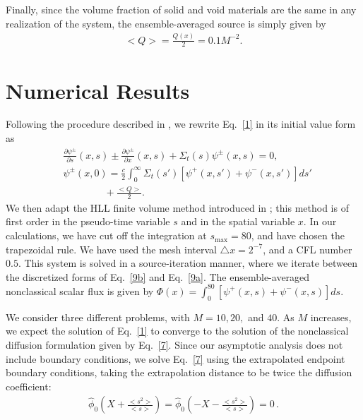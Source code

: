 \documentclass{anstrans}
\newcommand{\bl}{\big<}
\newcommand{\bg}{\big>}
\begin{document}
Finally, since the volume fraction of solid and void materials are the same in any realization of the system, the ensemble-averaged source is simply given by
\begin{align}
\bl Q\bg = \frac{Q(x)}{2} = 0.1M^{-2}.\nonumber
\end{align}


\section{Numerical Results}
Following the procedure described in \cite{vas15}, we rewrite Eq.\ \eqref{1} in its initial value form as
\begin{subequations}\label{9}
\begin{align}
&\frac{\partial\psi^{\pm}}{\partial s}(x,s) \pm \frac{\partial \psi^{\pm}}{\partial x}(x,s) + \Sigma_t(s)\psi^{\pm}(x,s)  = 0, \label{9a}\\
& \psi^{\pm}(x,0)= \frac{c}{2} \int_0^\infty \Sigma_t(s')[\psi^{+}(x,s')+\psi^{-}(x,s')]ds' \label{9b}\\
& \hspace{50pt}+ \frac{\bl Q\bg}{2}. \nonumber
\end{align}
\end{subequations}
We then adapt the HLL finite volume method introduced in \cite{kry13}; this method is of first order in the pseudo-time variable $s$ and in the spatial variable $x$. In our calculations, we have cut off the integration at $s_{\text{max}}=80$, and have chosen the trapezoidal rule. We have used the mesh interval $\triangle x=2^{-7}$, and a CFL number $0.5$. 
This system is solved in a source-iteration manner, where we iterate between the discretized forms of Eq.\ \eqref{9b} and Eq.\ \eqref{9a}. The ensemble-averaged nonclassical scalar flux is given by $\Phi(x) = \int_0^{80}[\psi^+(x,s)+\psi^-(x,s)]ds$.

We consider three different problems, with $M=10, 20,$ and $40$. As $M$ increases, we expect the solution of Eq.\ \eqref{1} to converge to the
solution of the nonclassical diffusion formulation given by Eq.\ \eqref{7}. Since our asymptotic analysis does not include boundary conditions, we solve Eq.\ \eqref{7} using the extrapolated endpoint boundary conditions, taking the extrapolation distance to be twice the diffusion coefficient:
\begin{align}
\hat\phi_0\left(X+\frac{\bl s^2\bg}{\bl s \bg}\right) = \hat\phi_0\left(-X-\frac{\bl s^2\bg}{\bl s\bg}\right)=0\,.\nonumber
\end{align}
\end{document}
